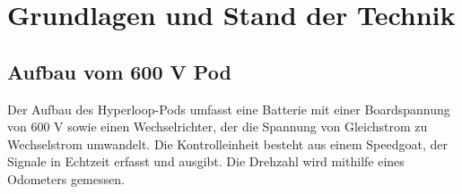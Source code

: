 \chapter{Grundlagen und Stand der Technik}
\section{Aufbau vom 600 V Pod}

Der Aufbau des Hyperloop-Pods umfasst eine Batterie mit einer Boardspannung von 600 V sowie einen Wechselrichter, der die Spannung von Gleichstrom zu Wechselstrom umwandelt. Die Kontrolleinheit besteht aus einem Speedgoat, der Signale in Echtzeit erfasst und ausgibt. Die Drehzahl wird mithilfe eines Odometers gemessen.